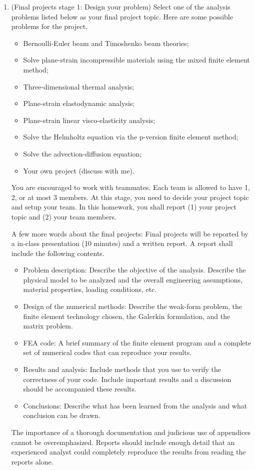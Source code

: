 \documentclass[12pt]{article}
\begin{document}
\begin{enumerate}
\item(Final projects stage 1: Design your problem) Select one of the analysis problems listed below as your final project topic. Here are some possible problems for the project.
\begin{itemize}
\item Bernoulli-Euler beam and Timoshenko beam theories;
\item Solve plane-strain incompressible materials using the mixed finite element method;
\item Three-dimensional thermal analysis;
\item Plane-strain elastodynamic analysis;
\item Plane-strain linear visco-elasticity analysis;
\item Solve the Helmholtz equation via the p-version finite element method;
\item Solve the advection-diffusion equation;
\item Your own project (discuss with me).
\end{itemize}
You are encouraged to work with teammates. Each team is allowed to have 1, 2, or at most 3 members. At this stage, you need to decide your project topic and setup your team. In this homework, you shall report (1) your project topic and (2) your team members.

A few more words about the final projects: Final projects will be reported by a in-class presentation (10 minutes) and a written report. A report shall include the following contents.
\begin{itemize}
\item Problem description: Describe the objective of the analysis. Describe the physical model to be analyzed and the overall engineering assumptions, material properties, loading conditions, etc.
\item Design of the numerical methods: Describe the weak-form problem, the finite element technology chosen, the Galerkin formulation, and the matrix problem.
\item FEA code: A brief summary of the finite element program and a complete set of numerical codes that can reproduce your results.
\item Results and analysis: Include methods that you use to verify the correctness of your code. Include important results and a discussion should be accompanied these results.
\item Conclusions: Describe what has been learned from the analysis and what conclusion can be drawn.
\end{itemize}
The importance of a thorough documentation and judicious use of appendices cannot be overemphasized. Reports should include enough detail that an experienced analyst could completely reproduce the results from reading the reports alone.
\end{enumerate}
\end{document}
